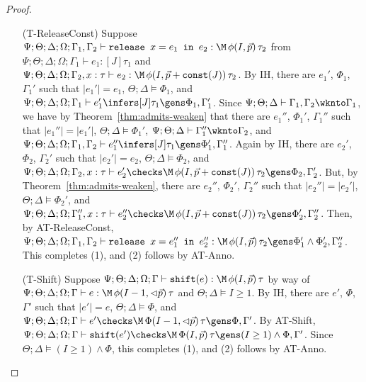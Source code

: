 \begin{proof}
\begin{itemize}
  \item[(T-ReleaseConst)] Suppose
  $\Psi ; \Theta ; \Delta ; \Omega ; \Gamma_1,\Gamma_2 \vdash \texttt{release } x = e_1 \texttt{ in }e_2 : \M \, \phi(I,\vec{p}) \, \tau_2$ from
  $\Psi ; \Theta ; \Delta ; \Omega ; \Gamma_1 \vdash e_1 : [J] \tau_1$ and
  $\Psi ; \Theta ; \Delta ; \Omega ; \Gamma_2, x : \tau \vdash e_2 : \M \, \phi(I,\vec{p} + \texttt{const}(J)) \, \tau_2$.
  By IH, there are $e_1'$, $\Phi_1$, $\Gamma_1'$ such that
  $|e_1'| = e_1$,
  $\Theta ; \Delta \vDash \Phi_1$, and
  $\Psi ; \Theta ; \Delta ; \Omega ; \Gamma_1 \vdash e_1' \infers [J] \tau_1 \gens \Phi_1,\Gamma_1'$.
  Since $\Psi ; \Theta ; \Delta \vdash \Gamma_1,\Gamma_2 \wknto \Gamma_1$, we have by Theorem~\ref{thm:admits-weaken}
  that there are $e_1''$, $\Phi_1'$, $\Gamma_1''$ such that
  $|e_1''| = |e_1'|$,
  $\Theta ; \Delta \vDash \Phi_1'$,
  $\Psi ; \Theta ; \Delta \vdash \Gamma_1'' \wknto \Gamma_2$, and
  $\Psi ; \Theta ; \Delta ; \Omega; \Gamma_1,\Gamma_2 \vdash e_1'' \infers [J] \tau_1 \gens \Phi_1',\Gamma_1''$.
  Again by IH, there are $e_2'$, $\Phi_2$, $\Gamma_2'$ such that
  $|e_2'| = e_2$,
  $\Theta ; \Delta \vDash \Phi_2$, and
  $\Psi ; \Theta ; \Delta ; \Omega ; \Gamma_2, x : \tau \vdash e_2' \checks \M \, \phi(I,\vec{p} + \texttt{const}(J)) \, \tau_2 \gens \Phi_2,\Gamma_2'$.
  But, by Theorem~\ref{thm:admits-weaken}, there are $e_2''$, $\Phi_2'$, $\Gamma_2''$ such that
  $|e_2''| = |e_2'|$,
  $\Theta ; \Delta \vDash \Phi_2'$, and
  $\Psi ; \Theta ; \Delta ; \Omega ; \Gamma_1'', x: \tau \vdash e_2'' \checks  \M \, \phi(I,\vec{p} + \texttt{const}(J)) \, \tau_2 \gens \Phi_2',\Gamma_2''$.
  Then, by AT-ReleaseConst, 
  $\Psi ; \Theta ; \Delta ; \Omega ; \Gamma_1,\Gamma_2 \vdash \texttt{release } x = e_1'' \texttt{ in }e_2'' : \M \, \phi(I,\vec{p}) \, \tau_2 \gens \Phi_1' \wedge \Phi_2',\Gamma_2''$.
  This completes (1), and (2) follows by AT-Anno.
  
  \item[(T-Shift)] Suppose $\Psi ; \Theta ; \Delta ; \Omega ; \Gamma \vdash \texttt{shift}(e) : \M \, \phi(I,\vec{p}) \, \tau$ by way of
  $\Psi ; \Theta ; \Delta ; \Omega ; \Gamma \vdash e : \M \, \phi(I - 1,\lhd \vec{p}) \, \tau$ and
  $\Theta ; \Delta \vDash I \geq 1$.
  By IH, there are $e'$, $\Phi$, $\Gamma'$ such that
  $|e'| = e$,
  $\Theta ; \Delta \vDash \Phi$, and
  $\Psi  ; \Theta ; \Delta ; \Omega; \Gamma \vdash e' \checks \M \, \Phi(I-1,\lhd \vec{p}) \, \tau \gens \Phi,\Gamma'$.
  By AT-Shift,
  $\Psi  ; \Theta ; \Delta ; \Omega; \Gamma \vdash \texttt{shift}(e') \checks \M \, \Phi(I,\vec{p}) \, \tau \gens (I \geq 1) \wedge \Phi,\Gamma'$.
  Since $\Theta ; \Delta \vDash (I \geq 1) \wedge \Phi$, this completes (1), and (2) follows by AT-Anno.


\end{itemize}
\end{proof}
